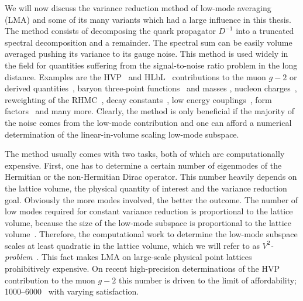 We will now discuss the variance reduction method of low-mode averaging~\cite{Neff_2001,DeGrand_2004,Giusti_2004,} (LMA) and some of its many variants which had a large influence in this thesis.
The method consists of decomposing the quark propagator $D^{-1}$ into a truncated spectral decomposition and a remainder.
The spectral sum can be easily volume averaged pushing its variance to its gauge noise.
This method is used widely in the field for quantities suffering from the signal-to-noise ratio problem in the long distance.
Examples are the HVP~\cite{bmw_2024,Kuberski_2023,Aubin:2022hgm,Bazavov:2024eou,RBC_2024} and HLbL~\cite{Lin:2024khg} contributions to the muon $g-2$ or derived quantities~\cite{ExtendedTwistedMass:2025tpc}, baryon three-point functions~\cite{Yang:2015zja,Ohki:2012jyg} and masses \cite{Bali:2010se}, nucleon charges~\cite{Yamanaka:2018uud}, reweighting of the RHMC~\cite{Kuberski:2023zky}, decay constants~\cite{Bali:2014pva}, low energy couplings~\cite{Bernardoni:2011kd}, form factors~\cite{JLQCD:2009ofg} and many more.
Clearly, the method is only beneficial if the majority of the noise comes from the low-mode contribution and one can afford a numerical determination of the linear-in-volume scaling low-mode subspace.

The method usually comes with two tasks, both of which are computationally expensive.
First, one has to determine a certain number of eigenmodes of the Hermitian or the non-Hermitian Dirac operator.
This number heavily depends on the lattice volume, the physical quantity of interest and the variance reduction goal.
Obviously the more modes involved, the better the outcome.
The number of low modes required for constant variance reduction is proportional to the lattice volume, because the size of the low-mode subspace is proportional to the lattice volume~\cite{banks1980}.
Therefore, the computational work to determine the low-mode subspace scales at least quadratic in the lattice volume, which we will refer to as \emph{$V^{2}$-problem}~\cite{Luescher2007}.
This fact makes LMA on large-scale physical point lattices prohibitively expensive.
On recent high-precision determinations of the HVP contribution to the muon $g-2$ this number is driven to the limit of affordability; \numrange{1000}{6000}~\cite{Djukanovic:2024cmq,RBC_2024,bmw_2024,Aubin:2022hgm} with varying satisfaction.

